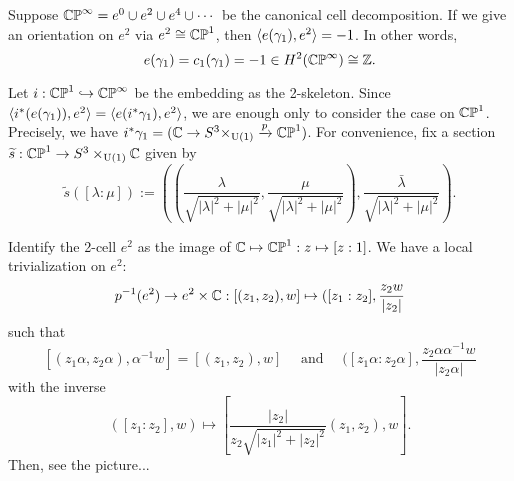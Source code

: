 \documentclass{../../../small}
\begin{document}
\begin{thm*}[4.13]
Suppose $\mathbb{CP}^\infty=e^0\cup e^2\cup e^4\cup\cdots$ be the canonical cell decomposition.
If we give an orientation on $e^2$ via $e^2\cong\mathbb{CP}^1$, then $\langle e(\gamma_1),e^2\rangle=-1$.
In other words,
\[e(\gamma_1)=c_1(\gamma_1)=-1\in H^2(\mathbb{CP}^\infty)\cong\mathbb{Z}.\]
\end{thm*}
\begin{pf}
Let $i:\mathbb{CP}^1\hookrightarrow\mathbb{CP}^\infty$ be the embedding as the 2-skeleton.
Since $\langle i^*(e(\gamma_1)),e^2\rangle=\langle e(i^*\gamma_1),e^2\rangle$, we are enough only to consider the case on $\mathbb{CP}^1$.
Precisely, we have $i^*\gamma_1=(\mathbb{C}\to S^3\times_{\mathrm{U}(1)}\xrightarrow{p}\mathbb{CP}^1)$.
For convenience, fix a section $\widetilde s:\mathbb{CP}^1\to S^3\times_{\mathrm{U}(1)}\mathbb{C}$ given by
\[\tilde s([\lambda:\mu]):=\left(\left(\frac{\lambda}{\sqrt{|\lambda|^2+|\mu|^2}},\frac{\mu}{\sqrt{|\lambda|^2+|\mu|^2}}\right),\frac{\bar\lambda}{\sqrt{|\lambda|^2+|\mu|^2}}\right).\]

Identify the 2-cell $e^2$ as the image of $\mathbb{C}\mapsto\mathbb{CP}^1:z\mapsto[z:1]$.
We have a local trivialization on $e^2$:
\[p^{-1}(e^2)\to e^2\times\mathbb{C}:[(z_1,z_2),w]\mapsto([z_1:z_2],\frac{z_2w}{|z_2|}\]
such that
\[[(z_1\alpha,z_2\alpha),\alpha^{-1}w]=[(z_1,z_2),w]\quad\text{ and }\quad([z_1\alpha:z_2\alpha],\frac{z_2\alpha\alpha^{-1}w}{|z_2\alpha|}\]
with the inverse
\[([z_1:z_2],w)\mapsto[\frac{|z_2|}{z_2\sqrt{|z_1|^2+|z_2|^2}}(z_1,z_2),w].\]
Then, see the picture...

\end{pf}
\end{document}

